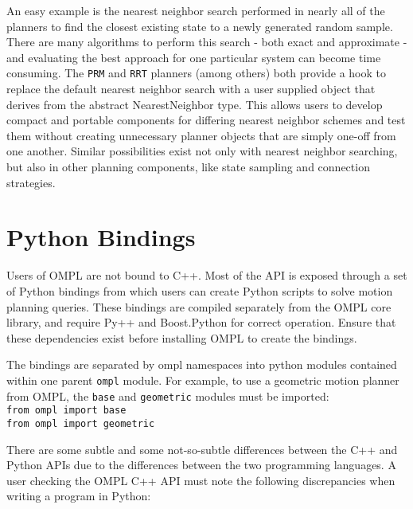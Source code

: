 An easy example is the nearest neighbor search performed in nearly all of the
planners to find the closest existing state to a newly generated random sample.
There are many algorithms to perform this search - both exact and approximate
- and evaluating the best approach for one particular system can become time
consuming.  The {\tt PRM} and {\tt RRT} planners (among others) both provide a
hook to replace the default nearest neighbor search with a user supplied 
object that derives from the abstract NearestNeighbor type.  This allows users 
to develop compact and portable components for differing nearest neighbor 
schemes and test them without creating unnecessary planner objects that are 
simply one-off from one another.  Similar possibilities exist not only with 
nearest neighbor searching, but also in other planning components, like state 
sampling and connection strategies.

\section {Python Bindings}
Users of OMPL are not bound to C++.  Most of the API is exposed through a set
of Python bindings from which users can create Python scripts to solve motion
planning queries.  These bindings are compiled separately from the OMPL core
library, and require Py++ and Boost.Python for correct operation.  Ensure that
these dependencies exist before installing OMPL to create the bindings.

The bindings are separated by ompl namespaces into python modules contained 
within one parent {\tt ompl} module.  For example, to use a geometric motion 
planner from OMPL, the {\tt base} and {\tt geometric} modules must be imported:
\\
{\tt from ompl import base\\
from ompl import geometric}

There are some subtle and some not-so-subtle differences between the C++ and 
Python APIs due to the differences between the two programming languages.  A
user checking the OMPL C++ API must note the following discrepancies when 
writing a program in Python:

